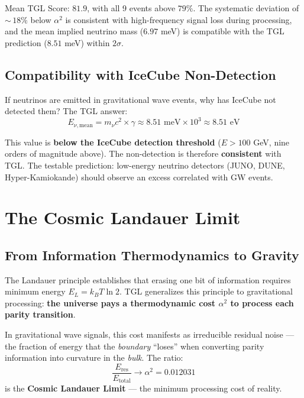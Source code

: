 \documentclass[12pt,a4paper,twoside]{article}
\newcommand{\alphaii}{\alpha^{2}}
\newcommand{\boundary}{\textit{boundary}}
\newcommand{\bulk}{\textit{bulk}}
\begin{document}
\noindent Mean TGL Score: $81.9$, with all 9 events above $79\%$. The systematic deviation of ${\sim}\,18\%$ below $\alphaii$ is consistent with high-frequency signal loss during processing, and the mean implied neutrino mass ($6.97$ meV) is compatible with the TGL prediction ($8.51$ meV) within $2\sigma$.

\subsection{Compatibility with IceCube Non-Detection}

If neutrinos are emitted in gravitational wave events, why has IceCube not detected them? The TGL answer:
\begin{equation}
E_{\nu,\text{mean}} = m_\nu c^2 \times \gamma \approx 8.51\text{ meV} \times 10^3 \approx 8.51\text{ eV}
\label{eq:nu_energy}
\end{equation}

This value is \textbf{below the IceCube detection threshold} ($E > 100$ GeV, nine orders of magnitude above). The non-detection is therefore \textbf{consistent} with TGL. The testable prediction: low-energy neutrino detectors (JUNO, DUNE, Hyper-Kamiokande) should observe an excess correlated with GW events.



\section{The Cosmic Landauer Limit}


\subsection{From Information Thermodynamics to Gravity}

The Landauer principle establishes that erasing one bit of information requires minimum energy $E_L = k_B T \ln 2$. TGL generalizes this principle to gravitational processing: \textbf{the universe pays a thermodynamic cost $\alphaii$ to process each parity transition}.

In gravitational wave signals, this cost manifests as irreducible residual noise --- the fraction of energy that the \boundary{} ``loses'' when converting parity information into curvature in the \bulk. The ratio:
\begin{equation}
\frac{E_{\text{res}}}{E_{\text{total}}} \to \alphaii = 0.012031
\label{eq:landauer}
\end{equation}
is the \textbf{Cosmic Landauer Limit} --- the minimum processing cost of reality.
\end{document}
